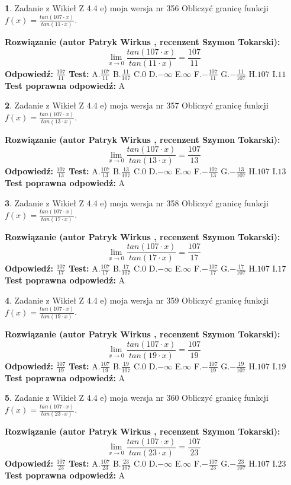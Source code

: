 \documentclass[12pt, a4paper]{article}
\theoremstyle{definition} %
\newtheorem{zad}{}
\newcommand{\zadStart}[1]{\begin{zad}#1\newline}
\newcommand{\zadStop}{\end{zad}}
\newcommand{\rozwStart}[2]{\noindent \textbf{Rozwiązanie (autor #1 , recenzent #2): }\newline}
\newcommand{\rozwStop}{\newline}
\newcommand{\odpStart}{\noindent \textbf{Odpowiedź:}\newline}
\newcommand{\odpStop}{\newline}
\newcommand{\testStart}{\noindent \textbf{Test:}\newline}
\newcommand{\testStop}{\newline}
\newcommand{\kluczStart}{\noindent \textbf{Test poprawna odpowiedź:}\newline}
\newcommand{\kluczStop}{\newline}
\begin{document}
\zadStart{Zadanie z Wikieł Z 4.4 e) moja wersja nr 356}
Obliczyć granicę funkcji $f(x)=\frac{tan(107\cdot x)}{tan(11\cdot x)}$.
\zadStop
\rozwStart{Patryk Wirkus}{Szymon Tokarski}
$$\lim\limits_{x\to 0}\frac{tan(107\cdot x)}{tan(11\cdot x)}=
\frac{107}{11}$$
\rozwStop
\odpStart
$\frac{107}{11}$
\odpStop
\testStart
A.$\frac{107}{11}$
B.$\frac{11}{107}$
C.$0$
D.$-\infty$
E.$\infty$
F.$-\frac{107}{11}$
G.$-\frac{11}{107}$
H.$107$
I.$11$
\testStop
\kluczStart
A
\kluczStop



\zadStart{Zadanie z Wikieł Z 4.4 e) moja wersja nr 357}
Obliczyć granicę funkcji $f(x)=\frac{tan(107\cdot x)}{tan(13\cdot x)}$.
\zadStop
\rozwStart{Patryk Wirkus}{Szymon Tokarski}
$$\lim\limits_{x\to 0}\frac{tan(107\cdot x)}{tan(13\cdot x)}=
\frac{107}{13}$$
\rozwStop
\odpStart
$\frac{107}{13}$
\odpStop
\testStart
A.$\frac{107}{13}$
B.$\frac{13}{107}$
C.$0$
D.$-\infty$
E.$\infty$
F.$-\frac{107}{13}$
G.$-\frac{13}{107}$
H.$107$
I.$13$
\testStop
\kluczStart
A
\kluczStop



\zadStart{Zadanie z Wikieł Z 4.4 e) moja wersja nr 358}
Obliczyć granicę funkcji $f(x)=\frac{tan(107\cdot x)}{tan(17\cdot x)}$.
\zadStop
\rozwStart{Patryk Wirkus}{Szymon Tokarski}
$$\lim\limits_{x\to 0}\frac{tan(107\cdot x)}{tan(17\cdot x)}=
\frac{107}{17}$$
\rozwStop
\odpStart
$\frac{107}{17}$
\odpStop
\testStart
A.$\frac{107}{17}$
B.$\frac{17}{107}$
C.$0$
D.$-\infty$
E.$\infty$
F.$-\frac{107}{17}$
G.$-\frac{17}{107}$
H.$107$
I.$17$
\testStop
\kluczStart
A
\kluczStop



\zadStart{Zadanie z Wikieł Z 4.4 e) moja wersja nr 359}
Obliczyć granicę funkcji $f(x)=\frac{tan(107\cdot x)}{tan(19\cdot x)}$.
\zadStop
\rozwStart{Patryk Wirkus}{Szymon Tokarski}
$$\lim\limits_{x\to 0}\frac{tan(107\cdot x)}{tan(19\cdot x)}=
\frac{107}{19}$$
\rozwStop
\odpStart
$\frac{107}{19}$
\odpStop
\testStart
A.$\frac{107}{19}$
B.$\frac{19}{107}$
C.$0$
D.$-\infty$
E.$\infty$
F.$-\frac{107}{19}$
G.$-\frac{19}{107}$
H.$107$
I.$19$
\testStop
\kluczStart
A
\kluczStop



\zadStart{Zadanie z Wikieł Z 4.4 e) moja wersja nr 360}
Obliczyć granicę funkcji $f(x)=\frac{tan(107\cdot x)}{tan(23\cdot x)}$.
\zadStop
\rozwStart{Patryk Wirkus}{Szymon Tokarski}
$$\lim\limits_{x\to 0}\frac{tan(107\cdot x)}{tan(23\cdot x)}=
\frac{107}{23}$$
\rozwStop
\odpStart
$\frac{107}{23}$
\odpStop
\testStart
A.$\frac{107}{23}$
B.$\frac{23}{107}$
C.$0$
D.$-\infty$
E.$\infty$
F.$-\frac{107}{23}$
G.$-\frac{23}{107}$
H.$107$
I.$23$
\testStop
\kluczStart
A
\kluczStop
\end{document}
